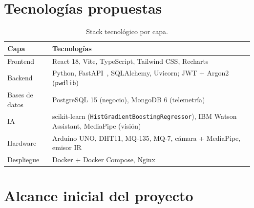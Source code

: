 \documentclass[11pt,a4paper]{article}
\begin{document}
\section{Tecnologías propuestas}

\begin{table}[H]\centering\small
\begin{tabular}{@{}L{3.2cm}L{11.6cm}@{}}
\toprule
\textbf{Capa} & \textbf{Tecnologías} \\
\midrule
Frontend & React 18, Vite, TypeScript, Tailwind CSS, Recharts \\
Backend & Python, FastAPI~\cite{fastapi}, SQLAlchemy, Uvicorn; JWT + Argon2 (\texttt{pwdlib}) \\
Bases de datos & PostgreSQL 15 (negocio), MongoDB 6 (telemetría) \\
IA & scikit-learn (\texttt{HistGradientBoostingRegressor}), IBM Watson Assistant, MediaPipe (visión) \\
Hardware & Arduino UNO, DHT11, MQ-135, MQ-7, cámara + MediaPipe, emisor IR \\
Despliegue & Docker + Docker Compose, Nginx \\
\bottomrule
\end{tabular}
\caption{Stack tecnológico por capa.}
\end{table}

\section{Alcance inicial del proyecto}\label{sec:alcance}
\end{document}

